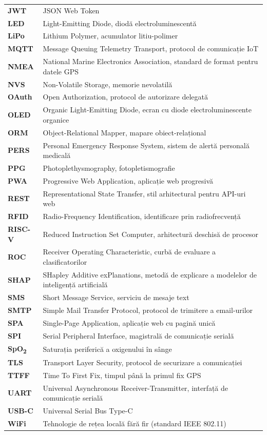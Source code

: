 \documentclass[12pt,a4paper]{article}
\newcommand{\spo}{SpO\textsubscript{2}}
\begin{document}
{\begin{longtable}{@{}>{\bfseries}p{2.7cm}p{10.6cm}@{}}
JWT & JSON Web Token\\
LED & Light-Emitting Diode, diodă electroluminescentă\\
LiPo & Lithium Polymer, acumulator litiu-polimer\\
MQTT & Message Queuing Telemetry Transport, protocol de comunicație IoT\\
NMEA & National Marine Electronics Association, standard de format pentru datele GPS\\
NVS & Non-Volatile Storage, memorie nevolatilă\\
OAuth & Open Authorization, protocol de autorizare delegată\\
OLED & Organic Light-Emitting Diode, ecran cu diode electroluminescente organice\\
ORM & Object-Relational Mapper, mapare obiect-relațional\\
PERS & Personal Emergency Response System, sistem de alertă personală medicală\\
PPG & Photoplethysmography, fotopletismografie\\
PWA & Progressive Web Application, aplicație web progresivă\\
REST & Representational State Transfer, stil arhitectural pentru API-uri web\\
RFID & Radio-Frequency Identification, identificare prin radiofrecvență\\
RISC-V & Reduced Instruction Set Computer, arhitectură deschisă de procesor\\
ROC & Receiver Operating Characteristic, curbă de evaluare a clasificatorilor\\
SHAP & SHapley Additive exPlanations, metodă de explicare a modelelor de inteligență artificială\\
SMS & Short Message Service, serviciu de mesaje text\\
SMTP & Simple Mail Transfer Protocol, protocol de trimitere a email-urilor\\
SPA & Single-Page Application, aplicație web cu pagină unică\\
SPI & Serial Peripheral Interface, magistrală de comunicație serială\\
\spo & Saturația periferică a oxigenului în sânge\\
TLS & Transport Layer Security, protocol de securizare a comunicației\\
TTFF & Time To First Fix, timpul până la primul fix GPS\\
UART & Universal Asynchronous Receiver-Transmitter, interfață de comunicație serială\\
USB-C & Universal Serial Bus Type-C\\
WiFi & Tehnologie de rețea locală fără fir (standard IEEE 802.11)\\
\end{longtable}
}
\end{document}
